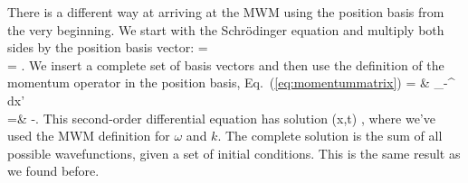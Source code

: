 There is a different way at arriving at the MWM using the position basis from the very beginning. We start with the Schr\"{o}dinger equation and multiply both sides by the position basis vector:
\bas
\I \hbar {}\ket{\Psi} = \ket{\Psi} \\
 \I \hbar {}\ket{\Psi} =  \ket{\Psi}.
\eas\marginnote[-2cm]{\ref{tool:sch}}%
We insert a complete set of basis vectors and then use the definition of the momentum operator in the position basis, Eq.~(\ref{eq:momentummatrix}) 
\bas
\I \hbar {} = & \int\displaylimits_{-\infty}^{\infty}  dx'\\
=& -.\label{eq:tdseforfree}
\eas\marginnote[-1cm]{\ref{tool:wavefunction}}%
This second-order differential equation has solution
\beq
\psi(x,t) \propto {},
\label{eq:tdsefreesol}
\eeq{}%
where we've used the MWM definition for $\omega$ and $k$. The complete solution is the sum of all possible wavefunctions, given a set of initial conditions. This is the same result as we found before.

